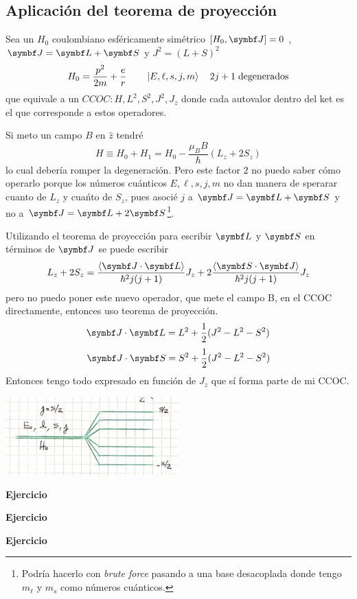 \documentclass[10pt,oneside]{CBFT_book}
\begin{document}
\subsection{Aplicación del teorema de proyección}

Sea un $H_0$ coulombiano esféricamente simétrico $[H_0,\vb{J}]=0$ , $\vb{J}=\vb{L}+\vb{S}$ y $J^2=(L+S)^2$
\[
	H_0 = \frac{p^2}{2m} + \frac{e}{r} \qquad \Ket{E,\ell,s,j,m} \quad 2j+1 \;\text{degenerados}
\]
que equivale a un $CCOC:H,L^2,S^2,J^2,J_z$ donde cada autovalor dentro del ket es el que corresponde a estos 
operadores.

Si meto un campo $B$ en $\hat{z}$ tendré 
\[
	H \equiv H_0 + H_1 = H_0 - \frac{\mu_B B}{\hbar}(L_z + 2S_z)
\]
lo cual debería romper la degeneración.
Pero este factor $2$ no puedo saber cómo operarlo porque los números cuánticos $E,\ell,s,j,m$ no dan
manera de sperarar cuanto de $L_z$ y cuańto de $S_z$, pues asocié $j$ a $\vb J = \vb L + \vb S$ y no a 
$\vb J = \vb L + 2 \vb S$\footnote{Podría hacerlo con {\it brute force} pasando a una base desacoplada
donde tengo $m_{\ell}$ y $m_s$ como números cuánticos.}.

Utilizando el teorema de proyección para escribir $\vb L$  y $\vb S$ en términos de $\vb J$ se puede
escribir
\[
	L_z + 2S_z = \frac{\Braket{\vb{J}\cdot\vb{L}}}{\hbar^2j(j+1)}J_z + 
		2\frac{\Braket{\vb{S}\cdot\vb{J}}}{\hbar^2j(j+1)}J_z
\]
pero no puedo poner este nuevo operador, que mete el campo B, en el CCOC directamente, entonces uso teorema 
de proyección.
\[
	\vb{J}\cdot\vb{L} = L^2 + \frac{1}{2}( J^2 - L^2 - S^2 )
\]
\[
	\vb{J}\cdot\vb{S} = S^2 + \frac{1}{2}( J^2 - L^2 - S^2 )
\]
Entonces tengo todo expresado en función de $J_z$ que sí forma parte de mi CCOC.

\includegraphics[width=0.5\textwidth]{images/fig_ft2_H_proy.jpg}

\begin{ejemplo}{\bf Ejercicio}
 
\end{ejemplo}

\begin{ejemplo}{\bf Ejercicio}
 
\end{ejemplo}


\begin{ejemplo}{\bf Ejercicio}
 
\end{ejemplo}



\end{document}
